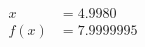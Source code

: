 \documentclass[preview]{standalone}
\begin{document}
\begin{align*}
x &= 4.9980\\f(x) &= 7.9999995
\end{align*}
\end{document}
